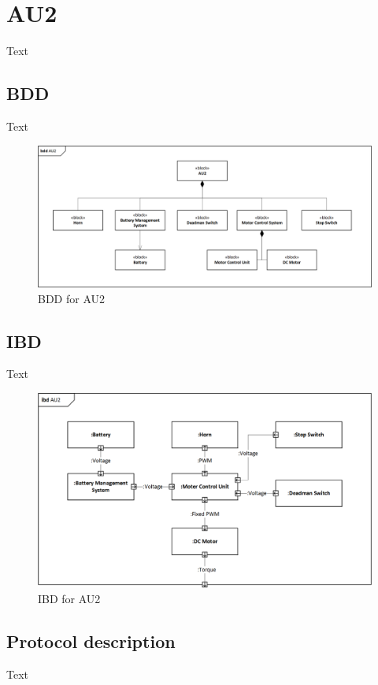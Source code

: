 \section{AU2}
Text

\subsection{BDD}
Text

\begin{figure}[H]
	\centering
	\includegraphics[width=0.9\linewidth]{Architecture/BDD_AU2}
	\caption{ BDD for AU2}
	\label{fig:AU2_BDD}
\end{figure}

\subsection{IBD}
Text

\begin{figure}[H]
	\centering
	\includegraphics[width=0.9\linewidth]{Architecture/IBD_AU2}
	\caption{IBD for AU2}
	\label{fig:AU2_IBD}
\end{figure}

\subsection{Protocol description}
Text